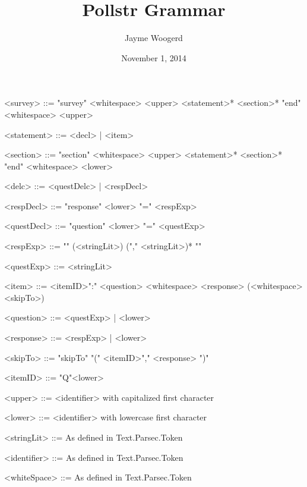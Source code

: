 \documentclass{article}
\title{Pollstr Grammar}
\author{Jayme Woogerd}
\date{November 1, 2014}
\begin{document}
\maketitle
\thispagestyle{empty}

\begin{grammar}

    <survey>     ::= "survey"  <whitespace> <upper> <statement>* <section>* "end" <whitespace> <upper>

    <statement>  ::= <decl> | <item>

    <section>    ::= "section" <whitespace> <upper> <statement>* <section>* "end" <whitespace> <lower>

    <delc>       ::= <questDelc> | <respDecl>

    <respDecl>   ::= "response" <lower> "=" <respExp>

    <questDecl>  ::= "question" <lower> "=" <questExp>

    <respExp>    ::= "{" (<stringLit>) ("," <stringLit>)* "}"

    <questExp>   ::= <stringLit>

    <item>       ::= <itemID>":" <question> <whitespace> <response> (<whitespace> <skipTo>)

    <question>   ::= <questExp> | <lower>

    <response>   ::= <respExp> | <lower>

    <skipTo>     ::= "skipTo" "(" <itemID>"," <response> ")"

    <itemID>     ::= "Q"<lower>

    <upper> ::= <identifier> with capitalized first character
    
    <lower>      ::= <identifier> with lowercase first character

    <stringLit>  ::= As defined in Text.Parsec.Token

    <identifier> ::= As defined in Text.Parsec.Token

    <whiteSpace> ::= As defined in Text.Parsec.Token


\end{grammar}
\end{document}
